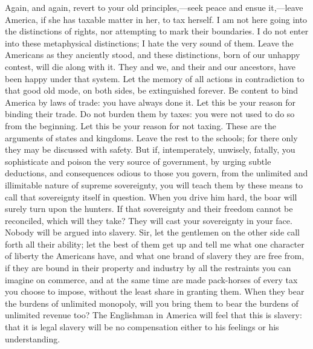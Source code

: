 Again, and again, revert to your old principles,—seek peace and ensue it,—leave America, if she has taxable matter in her, to tax herself. I am not here going into the distinctions of rights, nor attempting to mark their boundaries. I do not enter into these metaphysical distinctions; I hate the very sound of them. Leave the Americans as they anciently stood, and these distinctions, born of our unhappy contest, will die along with it. They and we, and their and our ancestors, have been happy under that system. Let the memory of all actions in contradiction to that good old mode, on both sides, be extinguished forever. Be content to bind America by laws of trade: you have always done it. Let this be your reason for binding their trade. Do not burden them by taxes: you were not used to do so from the beginning. Let this be your reason for not taxing. These are the arguments of states and kingdoms. Leave the rest to the schools; for there only they may be discussed with safety. But if, intemperately, unwisely, fatally, you sophisticate and poison the very source of government, by urging subtle deductions, and consequences odious to those you govern, from the unlimited and illimitable nature of supreme sovereignty, you will teach them by these means to call that sovereignty itself in question. When you drive him hard, the boar will surely turn upon the hunters. If that sovereignty and their freedom cannot be reconciled, which will they take? They will cast your sovereignty in your face. Nobody will be argued into slavery. Sir, let the gentlemen on the other side call forth all their ability; let the best of them get up and tell me what one character of liberty the Americans have, and what one brand of slavery they are free from, if they are bound in their property and industry by all the restraints you can imagine on commerce, and at the same time are made pack-horses of every tax you choose to impose, without the least share in granting them. When they bear the burdens of unlimited monopoly, will you bring them to bear the burdens of unlimited revenue too? The Englishman in America will feel that this is slavery: that it is legal slavery will be no compensation either to his feelings or his understanding.

